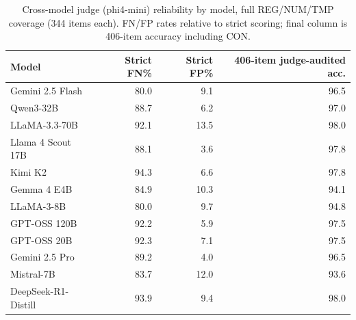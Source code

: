 \begin{table}[h]
\centering\small
\begin{tabular}{lrrr}
\toprule
Model & Strict FN\% & Strict FP\% & 406-item judge-audited acc. \\
\midrule
Gemini 2.5 Flash & 80.0 & 9.1 & 96.5 \\
Qwen3-32B & 88.7 & 6.2 & 97.0 \\
LLaMA-3.3-70B & 92.1 & 13.5 & 98.0 \\
Llama 4 Scout 17B & 88.1 & 3.6 & 97.8 \\
Kimi K2 & 94.3 & 6.6 & 97.8 \\
Gemma 4 E4B & 84.9 & 10.3 & 94.1 \\
LLaMA-3-8B & 80.0 & 9.7 & 94.8 \\
GPT-OSS 120B & 92.2 & 5.9 & 97.5 \\
GPT-OSS 20B & 92.3 & 7.1 & 97.5 \\
Gemini 2.5 Pro & 89.2 & 4.0 & 96.5 \\
Mistral-7B & 83.7 & 12.0 & 93.6 \\
DeepSeek-R1-Distill & 93.9 & 9.4 & 98.0 \\
\bottomrule
\end{tabular}
\caption{Cross-model judge (phi4-mini) reliability by model, full REG/NUM/TMP coverage (344 items
each). FN/FP rates relative to strict scoring; final column is 406-item accuracy including CON.}
\label{tab:judgereliability}
\end{table}

